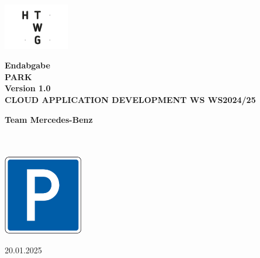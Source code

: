 \begin{titlepage}
    \begin{center}
        \vspace{0.5cm}
        
        \includegraphics[height=2cm]{resources/htwg-logo.png}
        
        \vspace{1.5cm}

        \Huge{\textbf{Endabgabe\\}}
        \vspace{0.5cm}
        \Huge{\textbf{PARK \\ Version 1.0 \\}}
        \vspace{0.5cm}
        \Huge{\textbf{CLOUD APPLICATION DEVELOPMENT WS WS2024/25}}
    
        \vspace{1.5cm}
 
        \Large{
            \textbf{Team Mercedes-Benz} \\
            \authorjonas \\
            \authorlukasb \\
            \authorlukase
        }
 
        \vspace{1.5cm}
        
        \includegraphics[height=3.5cm]{resources/logo.png}

        \vspace{1.5cm}

        \large{20.01.2025}
      
    \end{center}
 \end{titlepage}

\newpage
